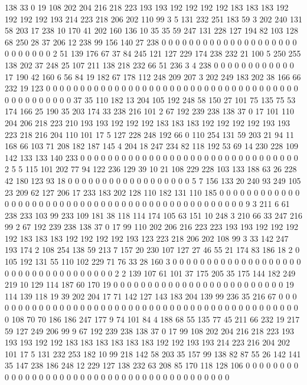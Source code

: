 138 33 0 19 108 202 204 216 218 223 193 193 192 192 192 192 183 183 183 192
192 192 192 193 214 223 218 206 202 110 99 3 5 131 232 251 183 59 3 202
240 131 58 203 17 238 10 170 41 202 160 136 10 35 35 59 247 131 228 127
194 82 103 128 68 250 28 37 206 12 238 99 156 140 27 238 0 0 0 0
0 0 0 0 0 0 0 0 0 0 0 0 0 0 0 0 0 0 0 0
0 0 0 2 51 139 176 67 37 84 245 121 127 229 174 238 232 21 100 5
250 255 138 202 37 248 25 107 211 138 218 232 66 51 236 3 4 238 0 0
0 0 0 0 0 0 0 0 0 0 17 190 42 160 6 56 84 19 182 67
178 112 248 209 207 3 202 249 183 202 38 166 66 232 19 123 0 0 0 0
0 0 0 0 0 0 0 0 0 0 0 0 0 0 0 0 0 0 0 0
0 0 0 0 0 0 0 0 0 0 0 0 0 0 0 0 0 0 0 0
0 0 0 37 35 110 182 13 204 105 192 248 58 150 27 101 75 135 75 53
174 166 25 190 35 203 174 33 238 216 101 2 67 192 239 238 138 37 0 17
101 110 204 206 218 223 210 193 193 192 192 192 183 183 183 192 192 192 192 193
193 223 218 216 204 110 101 17 5 127 228 248 192 66 0 110 254 131 59 203
21 94 11 168 66 103 71 208 182 187 145 4 204 18 247 234 82 118 192 53
69 14 230 228 109 142 133 133 140 233 0 0 0 0 0 0 0 0 0 0
0 0 0 0 0 0 0 0 0 0 0 0 0 0 0 0 0 0 0 0
0 0 2 5 5 115 101 202 77 94 122 236 129 39 10 21 108 229 228 103
133 188 63 26 228 42 180 123 93 18 0 0 0 0 0 0 0 0 0 0
0 0 0 0 0 0 0 0 5 7 156 133 20 240 93 249 105 23 209 62
127 206 17 233 183 202 128 110 182 131 110 185 0 0 0 0 0 0 0 0
0 0 0 0 0 0 0 0 0 0 0 0 0 0 0 0 0 0 0 0
0 0 0 0 0 0 0 0 0 0 0 0 0 0 0 0 0 0 0 9
3 211 6 61 238 233 103 99 233 109 181 38 118 114 174 105 63 151 10 248
3 210 66 33 247 216 99 2 67 192 239 238 138 37 0 17 99 110 202 206
216 223 223 193 193 192 192 192 192 183 183 183 192 192 192 192 193 123 223 218
206 202 108 99 3 33 142 247 193 174 2 108 254 138 59 213 7 157 20 230
107 127 27 46 55 21 174 83 186 18 2 0 105 192 131 55 110 102 229 71
76 33 28 160 3 0 0 0 0 0 0 0 0 0 0 0 0 0 0 0
0 0 0 0 0 0 0 0 0 0 0 0 0 0 0 0 0 0 0 0
2 2 139 107 61 101 37 175 205 35 175 144 182 249 219 10 129 114 187 60
170 19 0 0 0 0 0 0 0 0 0 0 0 0 0 0 0 0 0 0
0 0 0 0 0 0 0 19 114 139 118 19 39 202 204 17 71 142 127 143
183 204 139 99 236 35 216 67 0 0 0 0 0 0 0 0 0 0 0 0
0 0 0 0 0 0 0 0 0 0 0 0 0 0 0 0 0 0 0 0
0 0 0 0 0 0 0 0 0 0 0 0 0 0 0 108 70 70 186 186
247 177 9 74 101 84 4 188 68 55 135 77 45 211 66 232 19 217 59 127
249 206 99 9 67 192 239 238 138 37 0 17 99 108 202 204 216 218 223 193
193 193 192 192 183 183 183 183 183 183 192 192 193 193 214 223 216 204 202 101
17 5 131 232 253 182 10 99 218 142 58 203 35 157 99 138 82 87 55 26
142 141 35 147 238 186 248 12 229 127 138 232 63 208 85 170 118 128 106 0
0 0 0 0 0 0 0 0 0 0 0 0 0 0 0 0 0 0 0 0
0 0 0 0 0 0 0 0 0 0 0 0 0 0 0 0 0 0 0 0
